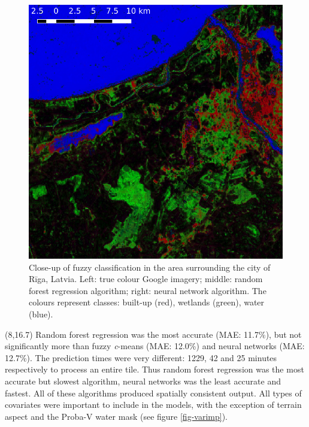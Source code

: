 \documentclass[20pt]{beamer}
\begin{document}
\begin{frame}{}
\begin{textblock}{7}
\begin{figure}
		  \includegraphics[width=2.3\TPHorizModule]{../thesis/thesis-figures/figures-qgis/riga-nn}
		  \caption{Close-up of fuzzy classification in the area surrounding the city of Rīga, Latvia. Left: true colour Google imagery; middle: random forest regression algorithm; right: neural network algorithm. The colours represent classes: built-up (red), wetlands (green), water (blue).}
		\end{figure}



	\end{textblock}
	
	\begin{textblock}{7}(8,16.7)
		\Line
		Random forest regression was the most accurate (MAE: 11.7\%), but not significantly more than fuzzy \textit{c}-means (MAE: 12.0\%) and neural networks (MAE: 12.7\%). The prediction times were very different: 1229, 42 and 25 minutes respectively to process an entire tile. Thus random forest regression was the most accurate but slowest algorithm, neural networks was the least accurate and fastest. All of these algorithms produced spatially consistent output. All types of covariates were important to include in the models, with the exception of terrain aspect and the Proba-V water mask (see figure \ref{fig-varimp}).
		

\end{textblock}
\end{frame}
\end{document}

